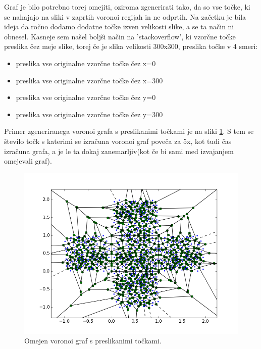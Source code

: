 \documentclass{egpubl}
\begin{document}
	Graf je bilo potrebno torej omejiti, oziroma zgenerirati tako, da so vse točke, ki se nahajajo na sliki v zaprtih voronoi regijah in ne odprtih. Na začetku je bila ideja da ročno dodamo dodatne točke izven velikosti slike, a se ta način ni obnesel. Kasneje sem našel boljši način na 'stackoverflow', ki vzorčne točke preslika čez meje slike, torej če je slika velikosti 300x300, preslika točke v 4 smeri:
		\begin{itemize} 
		\item preslika vse originalne vzorčne točke čez x=0
		\item preslika vse originalne vzorčne točke čez x=300
		\item preslika vse originalne vzorčne točke čez y=0
		\item preslika vse originalne vzorčne točke čez y=300
	\end{itemize}
	
	Primer zgeneriranega voronoi grafa s preslikanimi točkami je na sliki \ref{fig:clipped_voronoi}. S tem se število točk s katerimi se izračuna voronoi graf poveča za 5x, kot tudi čas izračuna grafa, a je le ta dokaj zanemarljiv(kot če bi sami med izvajanjem omejevali graf). 
	
	\begin{figure}[htb]
		\centering
		\parbox[t]{.9\columnwidth}{\relax
			\includegraphics[width=.95\linewidth]{bounded_voronoi.png}
		}
		\caption{\label{fig:clipped_voronoi}
			Omejen voronoi graf s preslikanimi točkami.}
	\end{figure}
\end{document}
